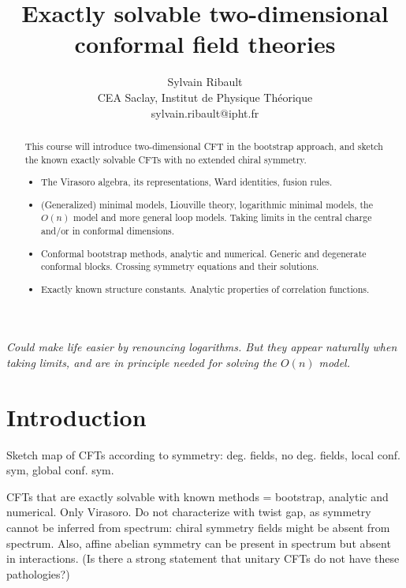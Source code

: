 \documentclass[12pt, a4paper]{article}
\title{\bfseries Exactly solvable two-dimensional \\ conformal field theories}
\author{Sylvain Ribault \vspace{2mm}
\\
{\normalsize CEA Saclay, Institut de Physique Th\'eorique}
 \\
 {\footnotesize \ttfamily sylvain.ribault@ipht.fr }
}
\theoremstyle{break}
\begin{document}
\maketitle


\begin{abstract}
This course will introduce two-dimensional CFT in the bootstrap approach, and sketch the known exactly solvable CFTs with no extended chiral symmetry.
\begin{itemize}
 \item The Virasoro algebra, its representations, Ward identities, fusion rules.
 \item (Generalized) minimal models, Liouville theory, logarithmic minimal models, the $O(n)$ model and more general loop models. Taking limits in the central charge and/or in conformal dimensions. 
 \item Conformal bootstrap methods, analytic and numerical. Generic and degenerate conformal blocks. Crossing symmetry equations and their solutions. 
 \item Exactly known structure constants. Analytic properties of correlation functions. 
\end{itemize}
\end{abstract}

\vspace{5mm}


\textit{
Could make life easier by renouncing logarithms. But they appear naturally when taking limits, and are in principle needed for solving the $O(n)$ model.}

\clearpage

\tableofcontents

\hypersetup{linkcolor=blue}

\setcounter{section}{-1}

\section{Introduction}

Sketch map of CFTs according to symmetry: deg. fields, no deg. fields, local conf. sym, global conf. sym.

CFTs that are exactly solvable with known methods = bootstrap, analytic and numerical. Only Virasoro. Do not characterize with twist gap, as symmetry cannot be inferred from spectrum: chiral symmetry fields might be absent from spectrum. Also, affine abelian symmetry can be present in spectrum but absent in interactions. (Is there a strong statement that unitary CFTs do not have these pathologies?)
\end{document}
